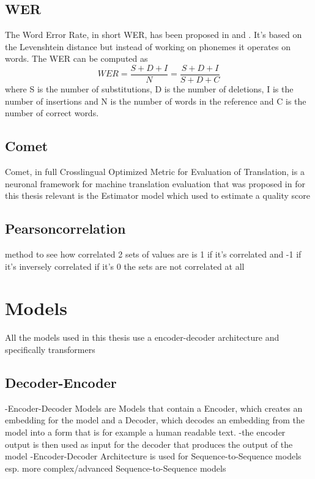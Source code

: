 \subsection{WER}
The Word Error Rate, in short WER, has been proposed in \cite{woodard1982} and \cite{morris2004}.
It's based on the Levenshtein distance but instead of working on phonemes it operates on words.
The WER can be computed as $$WER=\frac{S+D+I}{N}=\frac{S+D+I}{S+D+C}$$ where S is the number of substitutions, D is the number of deletions, I is the number of insertions and N is the number of words in the reference and C is the number of correct words.

\subsection{Comet}
Comet, in full Crosslingual Optimized Metric for Evaluation of Translation, is a neuronal framework for machine translation evaluation that was proposed in \cite{rei-etal-2020-comet} 
for this thesis relevant is the Estimator model which used to estimate a quality score 

\subsection{Pearsoncorrelation}
method to see how correlated 2 sets of values are
is 1 if it's correlated and -1 if it's inversely correlated 
if it's 0 the sets are not correlated at all

\section{Models}
All the models used in this thesis use a encoder-decoder architecture and specifically transformers
\subsection{Decoder-Encoder}
-Encoder-Decoder Models are Models that contain a Encoder, which creates an embedding for the model
and a Decoder, which decodes an embedding from the model into a form that is for example a human readable text. 
-the encoder output is then used as input for the decoder that produces the output of the model 
-Encoder-Decoder Architecture is used for Sequence-to-Sequence models esp. more complex/advanced Sequence-to-Sequence models 

